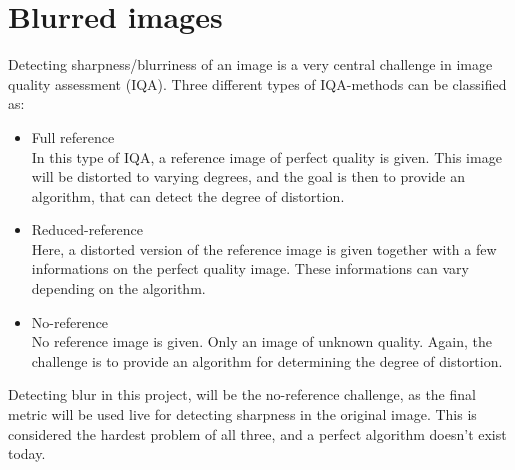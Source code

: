 \section{Blurred images}
Detecting sharpness/blurriness of an image is a very central challenge in image quality assessment (IQA). Three different types of IQA-methods can be classified as:

\begin{itemize}
    \item Full reference\\
In this type of IQA, a reference image of perfect quality is given. This image will be distorted to varying degrees, and the goal is then to provide an algorithm, that can detect the degree of distortion.
    \item Reduced-reference\\
Here, a distorted version of the reference image is given together with a few informations on the perfect quality image. These informations can vary depending on the algorithm.
    \item No-reference\\
No reference image is given. Only an image of unknown quality. Again, the challenge is to provide an algorithm for determining the degree of distortion.
\end{itemize}

Detecting blur in this project, will be the no-reference challenge, as the final metric will be used live for detecting sharpness in the original image. This is considered the hardest problem of all three, and a perfect algorithm doesn't exist today.


